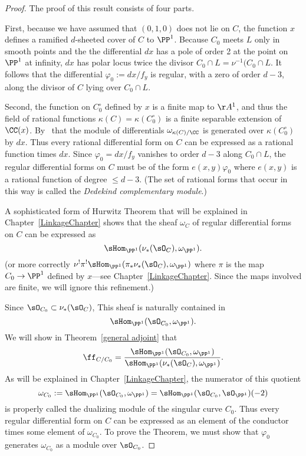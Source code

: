 \begin{proof}
The proof of this result consists of four parts. 

First, because we have assumed that $(0,1,0)$ does not lie on $C$, the function $x$ defines a
ramified $d$-sheeted cover of $C$ to $\PP^{1}$. Because $C_{0}$ meets $L$ only in smooth
points and the the differential $dx$ has a pole of order 2 at the point on $\PP^{1}$ at infinity,
$dx$
has polar locus twice the divisor $C_{0}\cap L = \nu^{-1}(C_{0}\cap L$. It follows that
the differential
$\varphi_0 := dx/f_{y}$ is regular, with a zero of order $d-3$,
along the divisor of $C$ lying over $C_0\cap L$.

Second, the function on $C^\circ_0$ defined by $x$  
is a finite map to $\AA^1$, and thus the field of rational functions $\kappa(C) = \kappa(C^\circ_0)$ is a finite
separable extension of $\CC(x)$. By~\cite[Section 16.5]{Eisenbud1995} that the module of differentials 
$\omega_{\kappa(C)/\CC}$ is generated over $\kappa(C^\circ_0)$ by $dx$. Thus every rational
differential form on $C$ can be expressed as a rational function
times $dx$. Since $\varphi_{0} = dx/f_{y}$ vanishes to order $d-3$ along $C_{0}\cap L$,
the regular differential forms on $C$ must be of the form $e(x,y)\varphi_{0}$ where
$e(x,y)$ is a rational function of degree $\leq d-3$. (The set of rational forms that occur in this
way is called the \emph{Dedekind complementary module}.)
 
A sophisticated form of Hurwitz Theorem that will be explained in Chapter~\ref{LinkageChapter}
shows that the sheaf $\omega_{C}$ of regular differential forms on $C$ can be expressed as
$$
\sHom_{\PP^{1}}(\nu_{*}(\sO_{C}), \omega_{\PP^{1}}).
$$
(or more correctly $\nu^{!}\pi^{!}\sHom_{\PP^{1}}(\pi_{*}\nu_{*}(\sO_{C}), \omega_{\PP^{1}})$
where $\pi$ is the map $C_{0}\to \PP^{1}$ defined by $x$---see Chapter~\ref{LinkageChapter}. Since the maps involved are finite,
we will ignore this refinement.)

Since $\sO_{C_{0}}\subset \nu_{*}(\sO_{C})$, This sheaf is naturally contained
in 
$$
\sHom_{\PP^{1}}(\sO_{C_{0}}, \omega_{\PP^{1}}).
$$
We will show in Theorem~\ref{general adjoint} that 
$$
\ff_{C/C_{0}} = 
\frac{\sHom_{\PP^{1}}(\sO_{C_{0}}, \omega_{\PP^{1}})}
{\sHom_{\PP^{1}}(\nu_{*}(\sO_{C}), \omega_{\PP^{1}})}.
$$
As will be explained in Chapter~\ref{LinkageChapter}, the numerator of this quotient
$$
\omega_{C_{0}}:= \sHom_{\PP^{1}}(\sO_{C_{0}}, \omega_{\PP^{1}}) = 
\sHom_{\PP^{1}}(\sO_{C_{0}}, \sO_{\PP^{1}})(-2)
$$
 is properly called the dualizing module  of the singular curve $C_{0}$.
Thus every regular differential form on $C$ can be expressed as an element of the conductor
times some element of $\omega_{C_{0}}$. To prove the Theorem, we must show that
$\varphi_{0}$ generates $\omega_{C_{0}}$ as a module over $\sO_{C_{0}}$.


\end{proof}
